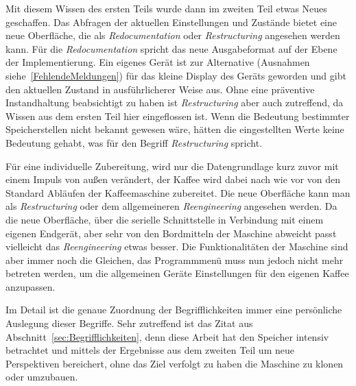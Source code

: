 Mit diesem Wissen des ersten Teils wurde dann im zweiten Teil etwas Neues geschaffen.
Das Abfragen der aktuellen Einstellungen und Zustände bietet eine neue Oberfläche, die als \textit{Redocumentation} oder \textit{Restructuring} angesehen werden kann.
Für die \textit{Redocumentation} spricht das neue Ausgabeformat auf der Ebene der Implementierung.
Ein eigenes Gerät ist zur Alternative (Ausnahmen siehe~\ref{FehlendeMeldungen}) für das kleine Display des Geräts geworden und gibt den aktuellen Zustand in ausführlicherer Weise aus.
Ohne eine präventive Instandhaltung beabsichtigt zu haben ist \textit{Restructuring} aber auch zutreffend, da Wissen aus dem ersten Teil hier eingeflossen ist.
Wenn die Bedeutung bestimmter Speicherstellen nicht bekannt gewesen wäre, hätten die eingestellten Werte keine Bedeutung gehabt, was für den Begriff \textit{Restructuring} spricht.

Für eine individuelle Zubereitung, wird nur die Datengrundlage kurz zuvor mit einem Impuls von außen verändert, der Kaffee wird dabei nach wie vor von den Standard Abläufen der Kaffeemaschine zubereitet.
Die neue Oberfläche kann man als \textit{Restructuring} oder dem allgemeineren \textit{Reengineering} angesehen werden.
Da die neue Oberfläche, über die serielle Schnittstelle in Verbindung mit einem eigenen Endgerät, aber sehr von den Bordmitteln der Maschine abweicht passt vielleicht das \textit{Reengineering} etwas besser.
Die Funktionalitäten der Maschine sind aber immer noch die Gleichen, das Programmmenü muss nun jedoch nicht mehr betreten werden, um die allgemeinen Geräte Einstellungen für den eigenen Kaffee anzupassen.

Im Detail ist die genaue Zuordnung der Begrifflichkeiten immer eine persönliche Auslegung dieser Begriffe.
Sehr zutreffend ist das Zitat aus Abschnitt~\ref{sec:Begrifflichkeiten}, denn diese Arbeit hat den Speicher intensiv betrachtet und mittels der Ergebnisse aus dem zweiten Teil um neue Perspektiven bereichert, ohne das Ziel verfolgt zu haben die Maschine zu klonen oder umzubauen.
